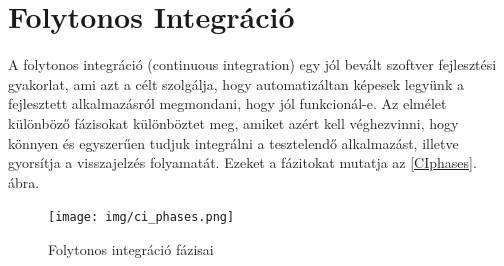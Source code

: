 \documentclass[11pt,magyar,a4paper,twoside,]{report}
\begin{document}
\section{Folytonos Integráció}\label{folytonos-integruxe1ciuxf3}

A folytonos integráció\citep{continuous-integration} (continuous
integration) egy jól bevált szoftver fejlesztési gyakorlat, ami azt a
célt szolgálja, hogy automatizáltan képesek legyünk a fejlesztett
alkalmazásról megmondani, hogy jól funkcionál-e. Az elmélet különböző
fázisokat különböztet meg, amiket azért kell véghezvinni, hogy könnyen
és egyszerűen tudjuk integrálni a tesztelendő alkalmazást, illetve
gyorsítja a visszajelzés folyamatát. Ezeket a fázitokat mutatja az
\ref{CIphases}. ábra.

\begin{figure}[H]
\centering
\texttt{[image: img/ci\_phases.png]}
\caption{Folytonos integráció fázisai}
\end{figure}
\end{document}
